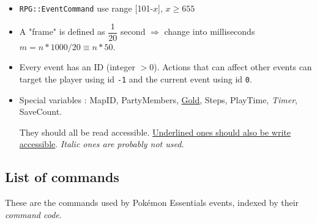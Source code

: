\documentclass[11pt]{article}
\begin{document}
{\begin{itemize}
	\item \verb|RPG::EventCommand| use range [101-$x$], $x\geq 655$
	
	\item A "frame" is defined as $\dfrac{1}{20}$ second $\Rightarrow$ change into milliseconds $m=n*1000/20\equiv n*50$.
	
	\item Every event has an ID (integer $>0$). Actions that can affect other events can target the player using id \verb|-1| and the current event using id \verb|0|.
	
	\item Special variables : MapID, PartyMembers, \underline{Gold}, Steps, PlayTime, \textit{Timer}, SaveCount.
	
	They should all be read accessible. \underline{Underlined ones should also be write accessible}. \textit{Italic ones are probably not used}.
\end{itemize}

\newpage
\subsection*{List of commands}

These are the commands used by Pokémon Essentials events, indexed by their \textit{command code}. 

}
\end{document}

